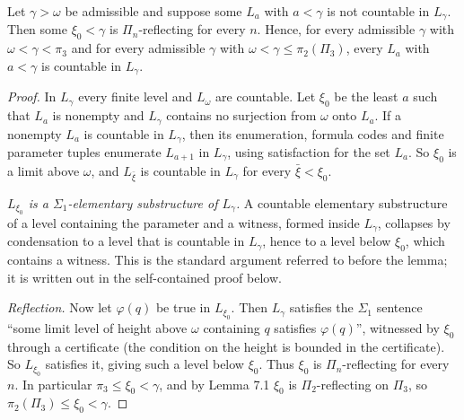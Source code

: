 \documentclass[11pt]{article}
\begin{document}
\begin{statement} Let $\gamma > \omega$ be admissible and suppose some $L_a$ with $a < \gamma$ is not countable in $L_{\gamma}$.
Then some $\xi_0 < \gamma$ is $\Pi_n$-reflecting for every $n$. Hence, for every admissible $\gamma$ with $\omega < \gamma < \pi_3$ and for every admissible $\gamma$ with
$\omega < \gamma \le \pi_2(\Pi_3)$, every $L_a$ with $a < \gamma$ is countable in $L_{\gamma}$.
\end{statement}

\begin{proof}
In $L_{\gamma}$ every finite level and $L_{\omega}$ are countable. Let $\xi_0$ be the least $a$ such that $L_a$ is
nonempty and $L_{\gamma}$ contains no surjection from $\omega$ onto $L_a$. If a nonempty $L_a$ is countable in
$L_{\gamma}$, then its enumeration, formula codes and finite parameter tuples enumerate $L_{a+1}$ in $L_{\gamma}$, using
satisfaction for the set $L_a$. So $\xi_0$ is a limit above $\omega$, and $L_{\bar{\xi}}$ is countable in $L_{\gamma}$
for every $\bar{\xi} < \xi_0$.

\emph{$L_{\xi_0}$ is a $\Sigma_1$-elementary substructure of $L_{\gamma}$.} A countable elementary substructure of a level containing the
parameter and a witness, formed inside $L_{\gamma}$, collapses by condensation to a level that is countable in
$L_{\gamma}$, hence to a level below $\xi_0$, which contains a witness. This is the standard argument referred to
before the lemma; it is written out in the self-contained proof below.

\emph{Reflection.} Now let $\varphi(q)$ be true in $L_{\xi_0}$. Then $L_{\gamma}$ satisfies the $\Sigma_1$ sentence
``some limit level of height above $\omega$ containing $q$ satisfies $\varphi(q)$'', witnessed by $\xi_0$ through a
certificate (the condition on the height is bounded in the certificate). So $L_{\xi_0}$ satisfies it, giving such a
level below $\xi_0$.
Thus $\xi_0$ is $\Pi_n$-reflecting for every $n$. In particular $\pi_3 \le \xi_0 < \gamma$, and by Lemma 7.1 $\xi_0$ is
$\Pi_2$-reflecting on $\Pi_3$, so $\pi_2(\Pi_3) \le \xi_0 < \gamma$.
\end{proof}
\end{document}
